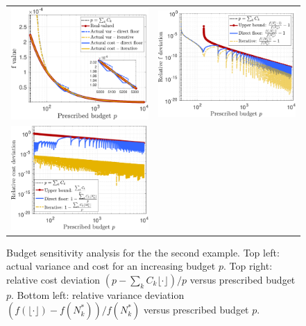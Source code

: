 %
\begin{figure}[!t]\centering
\begin{tabular}{cc}
\includegraphics[width=0.48\linewidth]{./Figures/Eg2_f_Cost.pdf}&
\includegraphics[width=0.48\linewidth]{./Figures/Eg2_f.pdf}\\
\includegraphics[width=0.48\linewidth]{./Figures/Eg2_Cost.pdf}
\end{tabular}
\caption{
Budget sensitivity analysis for the the second example. Top left: actual variance and cost for an increasing budget $p$. Top right: relative cost deviation $(p - \sum_k C_k \lfloor \cdot \rfloor)/p$ versus prescribed budget $p$. Bottom left: relative variance deviation $(f(\lfloor \cdot \rfloor) - f(N_k^*))/f(N_k^*)$ versus prescribed budget $p$. 
} 
\label{fig:Eg2} 
\end{figure}
%












